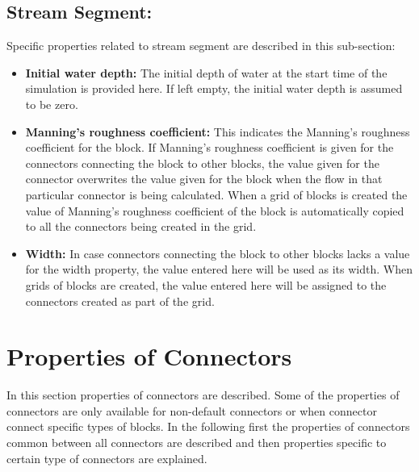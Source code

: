 \subsection{Stream Segment: }
Specific properties related to stream segment are described in this sub-section: 
\begin{itemize}
\item \textbf{Initial water depth: } The initial depth of water at the start time of the simulation is provided here. If left empty, the initial water depth is assumed to be zero. 
\item \textbf{Manning's roughness coefficient: } This indicates the Manning's roughness coefficient for the block. If Manning's roughness coefficient is given for the connectors connecting the block to other blocks, the value given for the connector overwrites the value given for the block when the flow in that particular connector is being calculated. When a grid of blocks is created the value of Manning's roughness coefficient of the block is automatically copied to all the connectors being created in the grid.
\item \textbf{Width: } In case connectors connecting the block to other blocks lacks a value for the width property, the value entered here will be used as its width. When grids of blocks are created, the value entered here will be assigned to the connectors created as part of the grid. 
\end{itemize}

\section{Properties of Connectors}
In this section properties of connectors are described. Some of the properties of connectors are only available for non-default  connectors or when connector connect specific types of blocks. In the following first the properties of connectors common between all connectors are described and then properties specific to certain type of connectors are explained. 

